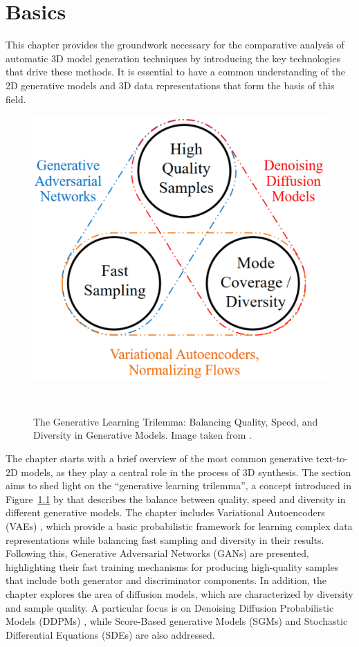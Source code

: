 \chapter{Basics}\label{ch:basics}

This chapter provides the groundwork necessary for the comparative analysis of automatic 3D model generation techniques by introducing the key technologies that drive these methods. It is essential to have a common understanding of the 2D generative models and 3D data representations that form the basis of this field.

\begin{figure}[ht]
  \centering
  \includegraphics[width=.4\columnwidth]{figures/BasicTrilemma.png}
  \caption{The Generative Learning Trilemma: Balancing Quality, Speed, and Diversity in Generative Models. Image taken from \citep{xiao2022tackling}.}~\label{fig:generativeTrilemma}
\end{figure}

The chapter starts with a brief overview of the most common generative text-to-2D models, as they play a central role in the process of 3D synthesis. The section aims to shed light on the ``generative learning trilemma'', a concept introduced in Figure~\ref{fig:generativeTrilemma} by \citeauthor{xiao2022tackling} that describes the balance between quality, speed and diversity in different generative models. The chapter includes Variational Autoencoders (VAEs) \citep{kingmaVAE,rezendeVAE}, which provide a basic probabilistic framework for learning complex data representations while balancing fast sampling and diversity in their results. Following this, Generative Adversarial Networks (GANs) \citep{goodfellowGAN} are presented, highlighting their fast training mechanisms for producing high-quality samples that include both generator and discriminator components. In addition, the chapter explores the area of diffusion models, which are characterized by diversity and sample quality. A particular focus is on Denoising Diffusion Probabilistic Models (DDPMs) \citep{hoDDPMs,sohlDDPM}, while Score-Based generative Models (SGMs) \citep{song2019SGM} and Stochastic Differential Equations (SDEs) \citep{song2020score,song2021maximum} are also addressed. 

